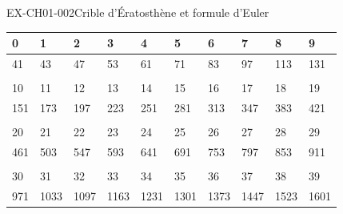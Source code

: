 \documentclass[12pt, a4paper]{article}
\begin{document}
\begin{exercice}{EX-CH01-002}{Crible d'Ératosthène et formule d'Euler}
\vspace{20pt}
\def\arraystretch{1.5}
\begin{tabularx}{\linewidth}{|*{10}{>{\centering\arraybackslash}X|}}
\hline
\cellcolor{vlmgray} 0 &\cellcolor{vlmgray} 1 &\cellcolor{vlmgray} 2 &\cellcolor{vlmgray} 3 &\cellcolor{vlmgray} 4 &\cellcolor{vlmgray} 5 &\cellcolor{vlmgray} 6 &\cellcolor{vlmgray} 7 &\cellcolor{vlmgray} 8 &\cellcolor{vlmgray}9 \\
\hline
\textcolor{\colSolution}{41} & \textcolor{\colSolution}{43} & \textcolor{\colSolution}{47} & \textcolor{\colSolution}{53} & \textcolor{\colSolution}{61} & \textcolor{\colSolution}{71} & \textcolor{\colSolution}{83} & \textcolor{\colSolution}{97} & \textcolor{\colSolution}{113} & \textcolor{\colSolution}{131} \\
\hline
\multicolumn{10}{X}{}\\
\hline
\cellcolor{vlmgray} 10 &\cellcolor{vlmgray} 11 &\cellcolor{vlmgray} 12 &\cellcolor{vlmgray} 13 &\cellcolor{vlmgray} 14 &\cellcolor{vlmgray} 15 &\cellcolor{vlmgray} 16 &\cellcolor{vlmgray} 17 &\cellcolor{vlmgray} 18 &\cellcolor{vlmgray}19 \\
\hline
\textcolor{\colSolution}{151} & \textcolor{\colSolution}{173} & \textcolor{\colSolution}{197} & \textcolor{\colSolution}{223} & \textcolor{\colSolution}{251} & \textcolor{\colSolution}{281} & \textcolor{\colSolution}{313} & \textcolor{\colSolution}{347} & \textcolor{\colSolution}{383} & \textcolor{\colSolution}{421} \\
\hline
\multicolumn{10}{X}{}\\
\hline
\cellcolor{vlmgray} 20 &\cellcolor{vlmgray} 21 &\cellcolor{vlmgray} 22 &\cellcolor{vlmgray} 23 &\cellcolor{vlmgray} 24 &\cellcolor{vlmgray} 25 &\cellcolor{vlmgray} 26 &\cellcolor{vlmgray} 27 &\cellcolor{vlmgray} 28 &\cellcolor{vlmgray}29 \\
\hline
\textcolor{\colSolution}{461} & \textcolor{\colSolution}{503} & \textcolor{\colSolution}{547} & \textcolor{\colSolution}{593} & \textcolor{\colSolution}{641} & \textcolor{\colSolution}{691} & \textcolor{\colSolution}{753} & \textcolor{\colSolution}{797} & \textcolor{\colSolution}{853} & \textcolor{\colSolution}{911} \\
\hline
\multicolumn{10}{X}{}\\
\hline
\cellcolor{vlmgray} 30 &\cellcolor{vlmgray} 31 &\cellcolor{vlmgray} 32 &\cellcolor{vlmgray} 33 &\cellcolor{vlmgray} 34 &\cellcolor{vlmgray} 35 &\cellcolor{vlmgray} 36 &\cellcolor{vlmgray} 37 &\cellcolor{vlmgray} 38 &\cellcolor{vlmgray}39 \\
\hline
\textcolor{\colSolution}{971} & \textcolor{\colSolution}{1033} & \textcolor{\colSolution}{1097} & \textcolor{\colSolution}{1163} & \textcolor{\colSolution}{1231} & \textcolor{\colSolution}{1301} & \textcolor{\colSolution}{1373} & \textcolor{\colSolution}{1447} & \textcolor{\colSolution}{1523} & \textcolor{\colSolution}{1601} \\
\hline
\end{tabularx}\def\arraystretch{1}

\end{exercice}
\end{document}
